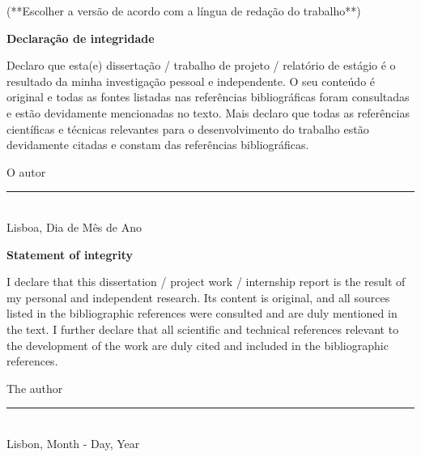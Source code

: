 \begin{center}
(**Escolher a versão de acordo com a língua de redação do trabalho**)
\end{center}

\begin{center}
    \textcolor{iselorange}{\textbf{Declaração de integridade}}
\end{center}

Declaro que esta(e) dissertação / trabalho de projeto / relatório de estágio é o resultado da minha investigação pessoal e independente. O seu conteúdo é original e todas as fontes listadas nas referências bibliográficas foram consultadas e estão devidamente mencionadas no texto. Mais declaro que todas as referências científicas e técnicas relevantes para o desenvolvimento do trabalho estão devidamente citadas e constam das referências bibliográficas.

\begin{center}
O autor
\\[3em]

\rule{.5\textwidth}{1pt}
\\[.5em]
\fontsize{10}{12.2}
\selectfont
Lisboa, Dia de Mês de Ano
\end{center}

\vspace{5em}
\begin{center}
    \textcolor{iselorange}{\textbf{Statement of integrity}}
\end{center}

I declare that this dissertation / project work / internship report is the result of my personal and independent research. Its content is original, and all sources listed in the bibliographic references were consulted and are duly mentioned in the text. I further declare that all scientific and technical references relevant to the development of the work are duly cited and included in the bibliographic references.

\begin{center}
The author
\\[3em]

\rule{.5\textwidth}{1pt}
\\[.5em]
\fontsize{10}{12.2}
\selectfont
Lisbon, Month - Day, Year
\end{center}

